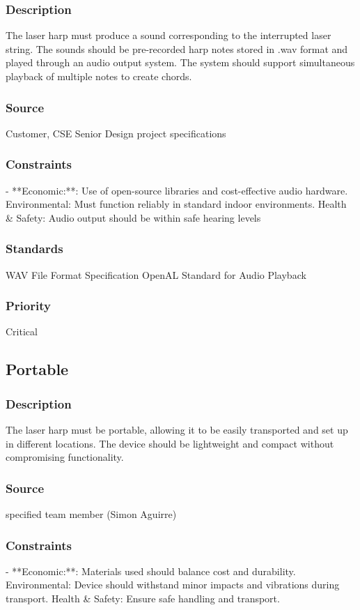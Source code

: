 \subsubsection{Description}
The laser harp must produce a sound corresponding to the interrupted laser string. The sounds should be pre-recorded harp notes stored in .wav format and played through an audio output system. The system should support simultaneous playback of multiple notes to create chords.
\subsubsection{Source}
Customer, CSE Senior Design project specifications
\subsubsection{Constraints}
- **Economic:**: Use of open-source libraries and cost-effective audio hardware.
Environmental: Must function reliably in standard indoor environments.
Health & Safety: Audio output should be within safe hearing levels
\subsubsection{Standards}
WAV File Format Specification
OpenAL Standard for Audio Playback
\subsubsection{Priority}
Critical


\subsection{Portable}
\subsubsection{Description}
The laser harp must be portable, allowing it to be easily transported and set up in different locations. The device should be lightweight and compact without compromising functionality.
\subsubsection{Source}
specified team member (Simon Aguirre)
\subsubsection{Constraints}
- **Economic:**: Materials used should balance cost and durability.
Environmental: Device should withstand minor impacts and vibrations during transport.
Health & Safety: Ensure safe handling and transport.
